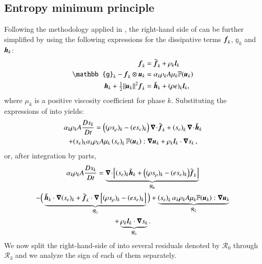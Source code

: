 \documentclass[preprint,10pt]{elsarticle}
\begin{document}
\subsection{Entropy minimum principle}
%
Following the methodology applied in \cite{jlg, Marco_paper_low_mach}, the right-hand side of 
 can be further simplified by using the following expressions
for the dissipative terms $\boldsymbol f_k$,  $\mathbb{g}_k$ and $\boldsymbol h_k$:
%
\begin{subequations}\label{eq:def-diss-terms-sect4}
\begin{align}
  \mbold f_k   &= \tilde{\mbold f}_k +\rho_k \mbold  l_k
  \\
  \mathbb{g}_k -  \mbold f_k \otimes \mbold u_k &= \alpha_k \rho_k A \mu_k \mathbb{F}(\mbold u_k) 
  \\
  \mbold h_k + \tfrac{1}{2}\| \mbold u_k\|^2  \mbold f_k &= \tilde{\mbold h}_k + (\rho e)_k \mbold l_k,
\end{align}
\end{subequations}
%
where $\mu_k$ is a positive viscosity coefficient for phase $k$. %
Substituting the expressions of  into  yields:
%
\begin{multline}\label{eq:ent-res-7-eqn-diss-terms_rearranged2}
\alpha_k \rho_k A \frac{Ds_k}{Dt} 
=  \left( (\rho s_\rho)_k - (e s_e)_k \right) \boldsymbol\nabla\! \cdot \! \tilde{\boldsymbol f}_k 
+ \left(s_e\right)_k \boldsymbol\nabla\! \cdot \! \tilde{ \boldsymbol h} _k \\
+ (s_e)_k \alpha_k \rho_k A \mu_k  \left(s_e\right)_k \mathbb{F}(\boldsymbol u_k) : \boldsymbol\nabla \boldsymbol u_k 
+ \rho_k \boldsymbol l _k \cdot \boldsymbol\nabla s_k \,,
\end{multline}
%
or, after integration by parts,
%
\begin{multline}\label{eq:ent-res-7-eqn-diss-terms2}
\alpha_k \rho_k A \frac{Ds_k}{Dt} = 
\underbrace{\boldsymbol\nabla\! \cdot \! \left[ (s_e)_k\tilde{\boldsymbol h}_k +\Big( (\rho s_\rho)_k - (e s_e)_k \Big) \tilde{\boldsymbol f}_k \right]}_{{\mathcal{R}_0}} \\
-\Big(
\underbrace{\tilde{\boldsymbol h}_k \cdot \boldsymbol\nabla (s_e)_k + \tilde{\boldsymbol f}_k \cdot \boldsymbol\nabla \left[  (\rho s_\rho)_k - (e s_e)_k \right]}_{\mathcal{R}_1} 
\Big)
+ \underbrace{ \left(s_e\right)_k \alpha_k \rho_k A \mu_k \mathbb{F}(\boldsymbol u_k) : \boldsymbol\nabla \boldsymbol u_k}_{\mathcal{R}_2} \\
+ \underbrace{\rho_k \boldsymbol l _k \cdot \boldsymbol\nabla s_k}_{\mathcal{R}_3}.
\end{multline}
%
We now split the right-hand-side of  into several residuals denoted by $\mathcal{R}_0$ through $\mathcal{R}_3$ and we analyze the sign of each of them separately. 
\end{document}
